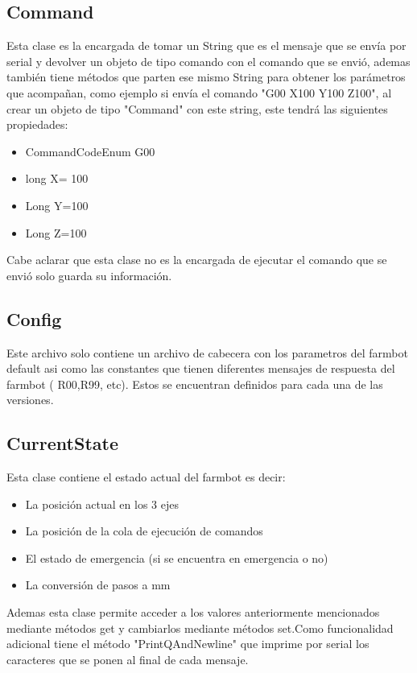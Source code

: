 \documentclass[letterpaper,12pt]{article}
\begin{document}
	
	\subsection{Command}
	Esta clase es la encargada de tomar un String que es el mensaje que se envía por serial y devolver un objeto de tipo comando con el comando que se envió, ademas también tiene métodos que parten ese mismo String para obtener los parámetros que acompañan, como ejemplo si envía el comando "G00 X100 Y100 Z100", al crear un objeto de tipo "Command" con este string, este tendrá las siguientes propiedades:
	\begin{itemize}
		\item CommandCodeEnum G00
		\item long X= 100
		\item Long Y=100
		\item Long Z=100
	\end{itemize}
	Cabe aclarar que esta clase no es la encargada de ejecutar el comando que se envió solo guarda su información.

	\subsection{Config}
	
	Este archivo solo contiene un archivo de cabecera con los parametros del farmbot default asi como las constantes que tienen diferentes mensajes de respuesta del farmbot ( R00,R99, etc). Estos se encuentran definidos para cada una de las versiones.
	
	\subsection{CurrentState}
	Esta clase contiene el estado actual del farmbot es decir:
	\begin{itemize}
		\item La posición actual en los 3 ejes
		\item La posición de la cola de ejecución de comandos
		\item El estado de emergencia (si se encuentra en emergencia o no)
		\item La conversión de pasos a mm 
	\end{itemize}
	Ademas esta clase permite acceder a los valores anteriormente mencionados mediante métodos get y cambiarlos mediante métodos set.Como funcionalidad adicional tiene el método "PrintQAndNewline" que imprime por serial los caracteres que se ponen al final de cada mensaje.
\end{document}
